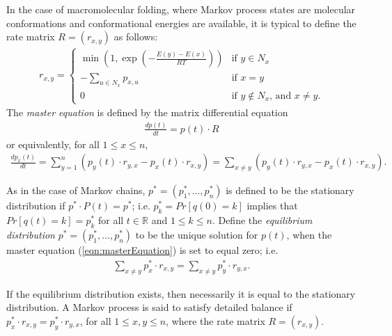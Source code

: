In the case of macromolecular folding, where Markov process states
are molecular conformations and conformational energies are available,
it is typical to define the rate matrix
$R = (r_{x,y})$ as follows:
\begin{eqnarray}
\label{eqn:transitionProb2}
r_{x,y} = \left\{
\begin{array}{ll}
\min\left(1,\exp(-\frac{E(y)-E(x)}{RT})\right)
&\mbox{if $y \in N_x$}\\
- \sum_{u \in N_x} p_{x,u} &\mbox{if $x=y$}\\
0 &\mbox{if $y \not\in N_x$, and $x \ne y$}.
\end{array} \right.
\end{eqnarray}
The {\em master equation} is defined by the matrix differential equation
\begin{eqnarray}
\label{eqn:masterEquationMatrix}
\frac{d p(t)}{dt} = p(t) \cdot R
\end{eqnarray}
or equivalently, for all $1 \leq x \leq n$,
\begin{eqnarray}
\label{eqn:masterEquation}
\frac{d p_x(t)}{dt} = \sum_{y=1}^n (p_y(t) \cdot r_{y,x} - p_x(t) \cdot r_{x,y})
  = \sum_{x \ne y} (p_y(t) \cdot r_{y,x} - p_x(t) \cdot r_{x,y}) .
\end{eqnarray}

As in the case of Markov chains,
$p^* = (p^*_1,\ldots,p^*_n)$ is defined to be
the stationary distribution if
$p^* \cdot P(t)= p^*$; i.e.  $p^*_k = Pr[ q(0) = k ]$ implies that
$Pr[ q(t) = k] = p^*_k$ for all $t \in \mathbb{R}$ and
$1 \leq k \leq n$.
Define the {\em equilibrium distribution} $p^* = (p^*_1,\ldots,p^*_n)$
to be the unique solution for $p(t)$, when the master equation
(\ref{eqn:masterEquation}) is set to equal zero; i.e.
\begin{eqnarray}
\label{eqn:equilibriumTime}
\sum_{x \ne y} p^*_x \cdot r_{x,y} = \sum_{x \ne y} p^*_y \cdot r_{y,x}.
\end{eqnarray}

If the equilibrium distribution exists, then necessarily it is equal to
the stationary distribution. A Markov process is said
to satisfy detailed balance if $p^*_x \cdot r_{x,y} = p^*_y \cdot r_{y,x}$,
for all $1 \leq x,y \leq n$, where the rate matrix $R = (r_{x,y})$.

